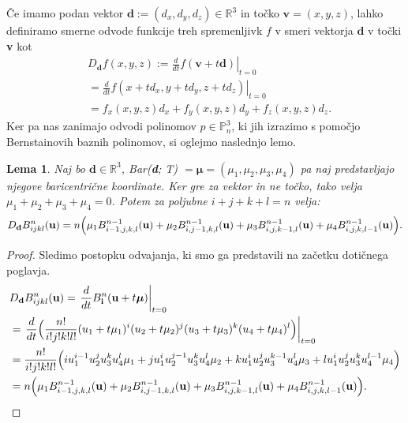 \documentclass[a4paper, 12pt]{article}
\theoremstyle{definition} %
\theoremstyle{plain} %
\newtheorem{lemma}[theorem]{Lema}
\begin{document}
Če imamo podan vektor $\textbf{d} := (d_x,d_y,d_z) \in \mathbb{R}^3$ in točko $\textbf{v} = (x, y, z)$, 
lahko definiramo smerne odvode funkcije treh spremenljivk $f$ v smeri 
vektorja $\textbf{d}$ v točki \textbf{v} kot 
\begin{align*}
  &\left.D_{\textbf{d}}f(x,y,z):=
  \frac{d}{dt}f(\textbf{v}+t\textbf{d})\right|_{t=0}\\
  &=\left.\frac{d}{dt}f(x+td_x,y+td_y,z+td_z)\right|_{t=0}\\
  &=f_x(x,y,z)d_x+f_y(x,y,z)d_y+f_z(x,y,z)d_z.
\end{align*}
Ker pa nas zanimajo odvodi polinomov $p\in\mathbb{P}_n^3$, ki jih izrazimo s pomočjo 
Bernstainovih baznih polinomov, si oglejmo naslednjo lemo.
  \begin{lemma}
        Naj bo $\textbf{d} \in \mathbb{R}^{3}$, 
        Bar(\textbf{d}; T) $= \boldsymbol{\mu} = (\mu_1,\mu_2,\mu_3,\mu_4)$ pa naj predstavljajo 
        njegove baricentrične koordinate. Ker gre za vektor in ne točko, tako velja 
        $\mu_1+\mu_2+\mu_3+\mu_4=0$.
        Potem za poljubne 
        $i+j+k+l=n$ velja:
        \begin{equation*}
          D_{\textbf{d}}B_{ijkl}^n(\textbf{u})
          = n\Bigl(\mu_1B_{i-1,j,k,l}^{n-1}(\textbf{u})+
          \mu_2B_{i,j-1,k,l}^{n-1}(\textbf{u})+
          \mu_3B_{i,j,k-1,l}^{n-1}(\textbf{u})+
          \mu_4B_{i,j,k,l-1}^{n-1}(\textbf{u})
          \Bigr).
        \end{equation*}
    \end{lemma}
    
    \begin{proof}
      Sledimo postopku odvajanja, ki smo ga predstavili na začetku dotičnega poglavja. 
      \begin{align*}
        &D_{\textbf{d}}B_{ijkl}^n(\textbf{u})
        =\left.\frac{d}{dt}B_{\textbf{i}}^n(\textbf{u}+t\boldsymbol{\mu})\right|_{t=0}\\
        &=\left.\frac{d}{dt}\Bigl(\frac{n!}{i!j!k!l!}(u_{1}+t\mu_{1})^{i}(u_{2}+t\mu_{2})^{j}(u_{3}+t\mu_{3})^{k}(u_{4}+t\mu_{4})^{l}\Bigr)\right|_{t=0}\\
        &=\frac{n!}{i!j!k!l!}\Bigl(iu_1^{i-1}u_2^{j}u_3^{k}u_4^{l}\mu_1+ju_1^{i}u_2^{j-1}u_3^{k}u_4^{l}\mu_2+ku_1^{i}u_2^{j}u_3^{k-1}u_4^{l}\mu_3+lu_1^{i}u_2^{j}u_3^{k}u_4^{l-1}\mu_4\Bigr)\\
        &= n\Bigl(\mu_1B_{i-1,j,k,l}^{n-1}(\textbf{u})+
        \mu_2B_{i,j-1,k,l}^{n-1}(\textbf{u})+
        \mu_3B_{i,j,k-1,l}^{n-1}(\textbf{u})+
        \mu_4B_{i,j,k,l-1}^{n-1}(\textbf{u})
        \Bigr).
      \end{align*}
    \end{proof}
\end{document}
